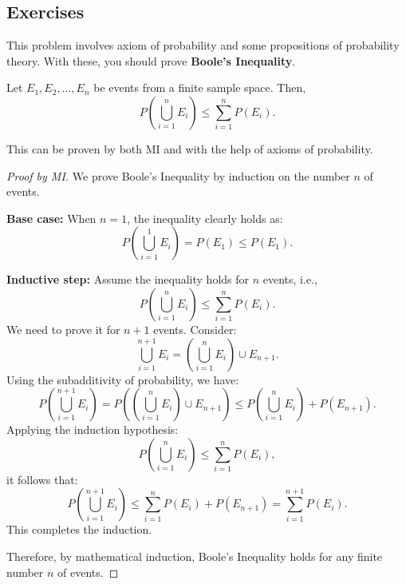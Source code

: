         \subsection{Exercises}
        \begin{exercise}
            This problem involves axiom of probability and some propositions of probability theory. With these, you should prove \textbf{Boole's Inequality}.
            \begin{theorem}
                Let \( E_1, E_2, \ldots, E_n \) be events from a finite sample space. Then,
                \[
                    P\left(\bigcup_{i=1}^n E_i\right) \leq \sum_{i=1}^n P(E_i).
                \]
            \end{theorem}    
        \end{exercise}

        This can be proven by both MI and with the help of axioms of probability.
        \begin{proof}[Proof by MI]
            We prove Boole's Inequality by induction on the number \( n \) of events.
        
            \textbf{Base case:} When \( n = 1 \), the inequality clearly holds as:
            \[
                P\left(\bigcup_{i=1}^1 E_i\right) = P(E_1) \leq P(E_1).
            \]
        
            \textbf{Inductive step:} Assume the inequality holds for \( n \) events, i.e.,
            \[
                P\left(\bigcup_{i=1}^n E_i\right) \leq \sum_{i=1}^n P(E_i).
            \]
            We need to prove it for \( n+1 \) events. Consider:
            \[
                \bigcup_{i=1}^{n+1} E_i = \left(\bigcup_{i=1}^n E_i\right) \cup E_{n+1}.
            \]
            Using the subadditivity of probability, we have:
            \[
                P\left(\bigcup_{i=1}^{n+1} E_i\right) = P\left(\left(\bigcup_{i=1}^n E_i\right) \cup E_{n+1}\right) \leq P\left(\bigcup_{i=1}^n E_i\right) + P(E_{n+1}).
            \]
            Applying the induction hypothesis:
            \[
                P\left(\bigcup_{i=1}^n E_i\right) \leq \sum_{i=1}^n P(E_i),
            \]
            it follows that:
            \[
                P\left(\bigcup_{i=1}^{n+1} E_i\right) \leq \sum_{i=1}^n P(E_i) + P(E_{n+1}) = \sum_{i=1}^{n+1} P(E_i).
            \]
            This completes the induction.
        
            Therefore, by mathematical induction, Boole's Inequality holds for any finite number \( n \) of events.
        \end{proof}

